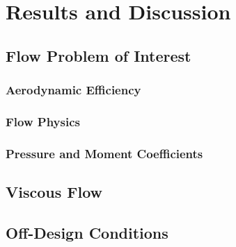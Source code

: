 \section{Results and Discussion} 
\label{sec:Results & Discussion}

\subsection{Flow Problem of Interest}
\label{sec:Flow_prob_interest}



\subsubsection{Aerodynamic Efficiency}
\label{sec:Aerodynamic efficiency}



\subsubsection{Flow Physics}
\label{sec:Flow physics}


\subsubsection{Pressure and Moment Coefficients}
\label{sec:Pressure coefficient}



\subsection{Viscous Flow}
\label{sec:ViscFlow}



\subsection{Off-Design Conditions}
\label{sec:ODC}


